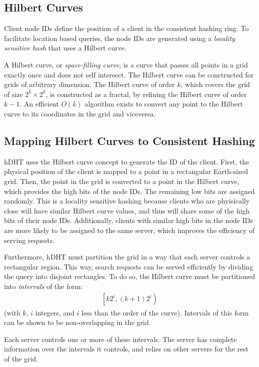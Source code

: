 \subsection{Hilbert Curves}

Client node IDs define the position of a client in the consistent hashing ring.
To facilitate location based queries, the node IDs are generated using a \textit{locality sensitive hash} that uses a Hilbert curve.

A Hilbert curve, or \textit{space-filling curve}, is a curve that passes all points in a grid exactly once and does not self intersect.
The Hilbert curve can be constructed for grids of arbitrary dimension.
The Hilbert curve of order $k$, which covers the grid of size $2^k \times 2^k$, is constructed as a fractal, by refining the Hilbert curve of order $k-1$.
An efficient $O(k)$ algorithm exists to convert any point to the Hilbert curve to its coordinates in the grid and viceversa.

\subsection{Mapping Hilbert Curves to Consistent Hashing}

hDHT uses the Hilbert curve concept to generate the ID of the client.
First, the physical position of the client is mapped to a point in a rectangular Earth-sized grid.
Then, the point in the grid is converted to a point in the Hilbert curve, which provides the high bits of the node IDs.
The remaining low bits are assigned randomly.
This is a locality sensitive hashing because clients who are phyisically close will have similar Hilbert curve values, and thus will share some of the high bits of their node IDs.
Additionally, clients with similar high bits in the node IDs are more likely to be assigned to the same server, which improves the efficiency of serving requests.

Furthermore, hDHT must partition the grid in a way that each server controls a rectangular region.
This way, search requests can be served efficiently by dividing the query into disjoint rectangles.
To do so, the Hilbert curve must be partitioned into \textit{intervals} of the form:
\begin{align}
\left[k 2^i, (k+1) 2^i\right)
\end{align}
(with $k$, $i$ integers, and $i$ less than the order of the curve).
Intervals of this form can be shown to be non-overlapping in the grid.

Each server controls one or more of these intervals.
The server has complete information over the intervals it controls, and relies on other servers for the rest of the grid.


